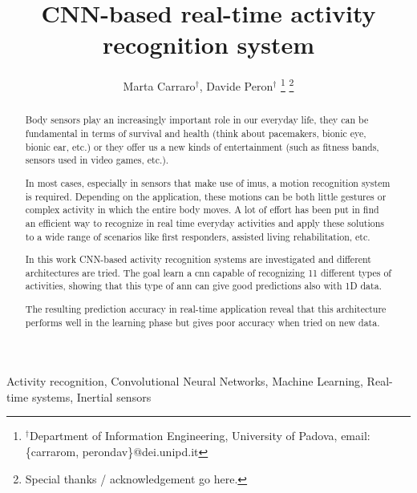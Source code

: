 \documentclass[10pt, conference, letterpaper]{IEEEtran}
\title{CNN-based real-time activity recognition system}
\author{Marta Carraro$^\dag$, Davide Peron$^\dag$
\thanks{$^\dag$Department of Information Engineering, University of Padova, email: \{carrarom, perondav\}@dei.unipd.it}
\thanks{Special thanks / acknowledgement go here.}
}
\begin{document}
\maketitle

\begin{abstract}
Body sensors play an increasingly important role in our everyday life, they can be fundamental in terms of survival and health (think about pacemakers, bionic eye, bionic ear, etc.) or they offer us a new kinds of entertainment (such as fitness bands, sensors used in video games, etc.).

In most cases, especially in sensors that make use of \glspl{imu}, a motion recognition system is required. Depending on the application, these motions can be both little gestures or complex activity in which the entire body moves.
A lot of effort has been put in find an efficient way to recognize in real time everyday activities and apply these solutions to a wide range of scenarios like first responders, assisted living rehabilitation, etc.

In this work CNN-based activity recognition systems are investigated and different architectures are tried. The goal learn a \gls{cnn} capable of recognizing 11 different types of activities, showing that this type of \gls{ann} can give good predictions also with 1D data.

The resulting prediction accuracy in real-time application reveal that this architecture performs well in the learning phase but gives poor accuracy when tried on new data.
\end{abstract}

\IEEEkeywords
Activity recognition, Convolutional Neural Networks, Machine Learning, Real-time systems, Inertial sensors
\endIEEEkeywords









{}



\end{document}
